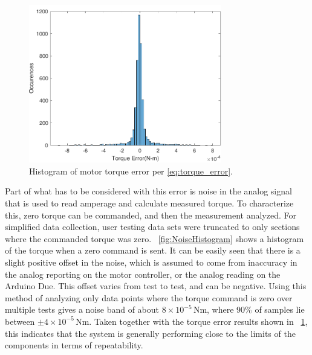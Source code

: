 \documentclass[hardware,article,submit,pdftex,moreauthors]{Definitions/mdpi}
\begin{document}
\begin{figure}[tb]
  \centering
  \includegraphics[width=0.75\textwidth]{diagrams/ErrorHistogram.pdf}
  \caption{Histogram of motor torque error per \eqref{eq:torque_error}.}
  \label{fig:ErrorHistogram}
\end{figure}

Part of what has to be considered with this error is noise in the analog signal that is used to read amperage and calculate measured torque.
To characterize this, zero torque can be commanded, and then the measurement analyzed.  
For simplified data collection, user testing data sets were truncated to only sections where the commanded torque was zero.
\figurename~\ref{fig:NoiseHistogram} shows a histogram of the torque when a zero command is sent.
It can be easily seen that there is a slight positive offset in the noise, which is assumed to come from inaccuracy in the analog reporting on the motor controller, or the analog reading on the Arduino Due.
This offset varies from test to test, and can be negative.
Using this method of analyzing only data points where the torque command is zero over multiple tests gives a noise band of about $8 \times 10^{-5}$\,Nm, where 90\% of samples lie between $\pm 4 \times 10^{-5}$\,Nm.
Taken together with the torque error results shown in \figurename~\ref{fig:ErrorHistogram}, this indicates that the system is generally performing close to the limits of the components in terms of repeatability.
\end{document}

